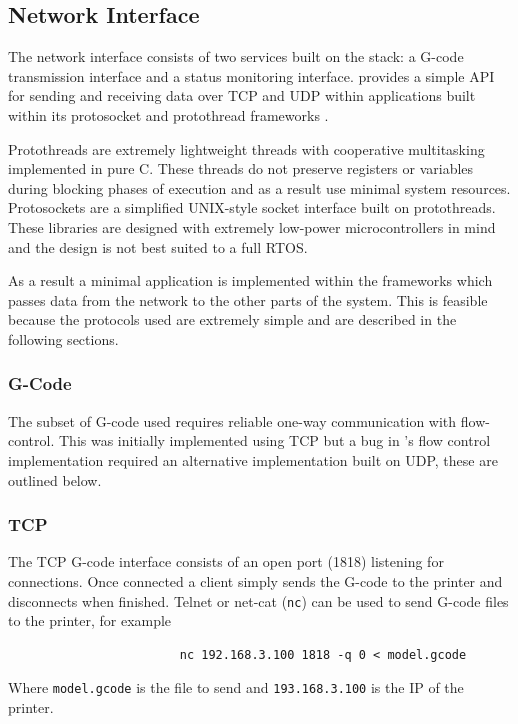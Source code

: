 		\subsection{Network Interface}
			
			The network interface consists of two services built on the \uIP{} stack:
			a G-code transmission interface and a status monitoring interface. \uIP{}
			provides a simple API for sending and receiving data over TCP and UDP
			within applications built within its protosocket and protothread
			frameworks \cite{uIP}.
			
			Protothreads are extremely lightweight threads with cooperative
			multitasking implemented in pure C. These threads do not preserve
			registers or variables during blocking phases of execution and as a result
			use minimal system resources. Protosockets are a simplified UNIX-style
			socket interface built on protothreads. These libraries are designed with
			extremely low-power microcontrollers in mind and the design is not best
			suited to a full RTOS.
			
			As a result a minimal application is implemented within the \uIP{}
			frameworks which passes data from the network to the other parts of the
			system. This is feasible because the protocols used are extremely simple
			and are described in the following sections.
			
			\subsubsection{G-Code}
				
				The subset of G-code used requires reliable one-way communication with
				flow-control. This was initially implemented using TCP but a bug in
				\uIP{}'s flow control implementation required an alternative
				implementation built on UDP, these are outlined below.
				
				\subsubsection{TCP}
					
					The TCP G-code interface consists of an open port (1818) listening for
					connections. Once connected a client simply sends the G-code to the
					printer and disconnects when finished. Telnet or net-cat (\verb|nc|)
					can be used to send G-code files to the printer, for example
					\begin{verbatim}
						nc 192.168.3.100 1818 -q 0 < model.gcode
					\end{verbatim}
					Where \verb|model.gcode| is the file to send and \verb|193.168.3.100|
					is the IP of the printer.
				
